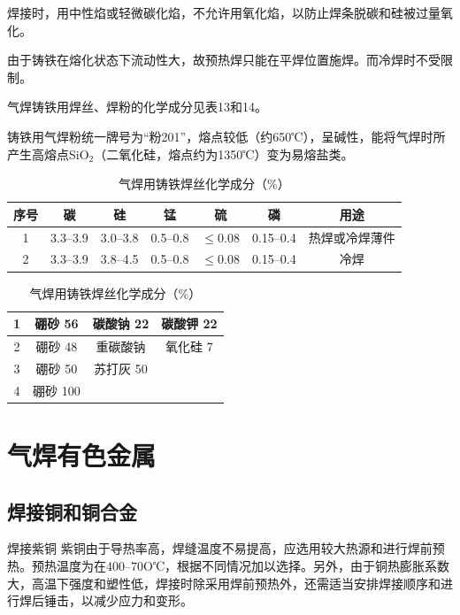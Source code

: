 \documentclass{ctexbook}
\begin{document}
焊接时，用中性焰或轻微碳化焰，不允许用氧化焰，以防止焊条脱碳和硅被过量氧化。

由于铸铁在熔化状态下流动性大，故预热焊只能在平焊位置施焊。而冷焊时不受限制。

气焊铸铁用焊丝、焊粉的化学成分见表13和14。

铸铁用气焊粉统一牌号为“粉201”，熔点较低（约650℃），呈碱性，能将气焊时所产生高熔点SiO$_2$（二氧化硅，熔点约为1350℃）变为易熔盐类。
\begin{table}[htbp]
	\centering
	\caption{气焊用铸铁焊丝化学成分（\%）}
	\begin{tabular}{c|c|c|c|c|c|c}
		\hline
	 序号&碳&硅&锰&硫&磷&用途 \\ \hline
		1&3.3--3.9&3.0--3.8&0.5--0.8&$\leqslant0.08$&0.15--0.4&热焊或冷焊薄件\\ \hline
		2&3.3--3.9&3.8--4.5&0.5--0.8&$\leqslant$0.08&0.15--0.4&冷焊		  \\ \hline
	\end{tabular}%
	\label{tab:qihanzhutie}%
\end{table}%

\begin{table}[htbp]
	\centering
	\caption{气焊用铸铁焊丝化学成分（\%）}
	\begin{tabular}{c|c|c|c}
		\hline
	1&硼砂 56& 碳酸钠 22& 碳酸钾 22\\ \hline
	2&硼砂 48&重碳酸钠\footnotemark 45&氧化硅 7\\ \hline
	3&硼砂 50&苏打灰 50 \footnotemark&\\ \hline
	4&硼砂 100&&\\ \hline
	\end{tabular}%
	\label{tab:qihanfen}%
\end{table}%
\section{气焊有色金属}
\subsection{焊接铜和铜合金}
焊接紫铜
紫铜由于导热率高，焊缝温度不易提高，应选用较大热源和进行焊前预热。预热温度为在400--70O℃，根据不同情况加以选择。另外，由于铜热膨胀系数大，高温下强度和塑性低，焊接时除采用焊前预热外，还需适当安排焊接顺序和进行焊后锤击，以减少应力和变形。
\end{document}
